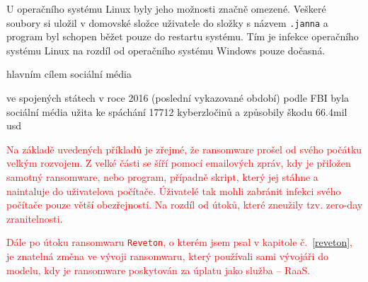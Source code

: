 \documentclass[a4paper,12pt]{article}
\begin{document}
U operačního systému Linux byly jeho možnosti značně omezené. Veškeré soubory si uložil v domovské složce uživatele do složky s názvem \texttt{.janna} a program byl schopen běžet pouze do restartu systému. Tím je infekce operačního systému Linux na rozdíl od operačního systému Windows pouze dočasná.\cite{koobface-linux}\cite{koobface-softpedia}





hlavním cílem sociální média\cite{koobface-kaspersky}

ve spojených státech v roce 2016 (poslední vykazované období) podle FBI byla sociální média užita ke spáchání 17712 kyberzločinů a způsobily škodu 66.4mil usd\cite{koobface-kaspersky}






\textcolor{red}{Na základě uvedených příkladů je zřejmé, že ransomware prošel od svého počátku velkým rozvojem. Z velké části se šíří pomocí emailových zpráv, kdy je přiložen samotný ransomware, nebo program, případně skript, který jej stáhne a naintaluje do uživatelova počítače. Úživatelé tak mohli zabránit infekci svého počítače pouze větší obezřejností. Na rozdíl od útoků, které zneužily tzv. zero-day zranitelnosti.}

\textcolor{red}{Dále po útoku ransomwaru \texttt{Reveton}, o kterém jsem psal v kapitole č.~\ref{reveton}, je znatelná změna ve vývoji ransomwaru, který používali sami vývojáři do modelu, kdy je ransomware poskytován za úplatu jako služba -- RaaS.}




\OdsazovaniOdstavcuStop
\end{document}
